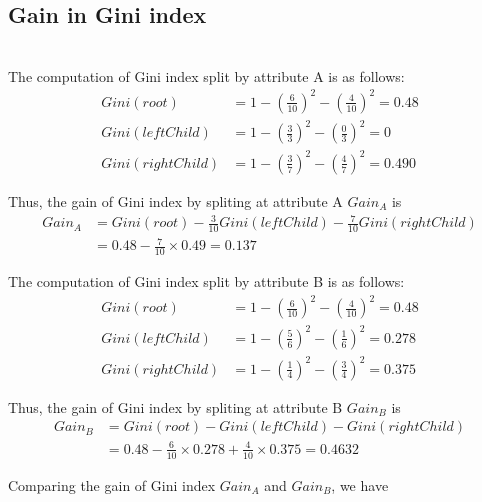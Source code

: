 \documentclass[11pt,a4paper]{article}
\begin{document}
\newpage
\subsection{Gain in Gini index} 

\\

The computation of Gini index split by attribute A is as follows:
\begin{align*}
    Gini(root) &= 1 - (\frac{6}{10})^2 - (\frac{4}{10})^2 = 0.48 \\
    Gini(leftChild) &= 1 - (\frac{3}{3})^2 - (\frac{0}{3})^2 = 0 \\
    Gini(rightChild) &= 1 - (\frac{3}{7})^2 - (\frac{4}{7})^2 = 0.490 
 \end{align*}

 Thus, the gain of Gini index by spliting at attribute A $Gain_A$ is 
\begin{align*}
    Gain_A &= Gini(root) - \frac{3}{10} Gini(leftChild) - \frac{7}{10}Gini(rightChild) \\
           &= 0.48 - \frac{7}{10} \times 0.49  = 0.137
 \end{align*}

The computation of Gini index split by attribute B is as follows:
\begin{align*}
    Gini(root) &= 1 - (\frac{6}{10})^2 - (\frac{4}{10})^2 = 0.48 \\
    Gini(leftChild) &= 1 - (\frac{5}{6})^2 - (\frac{1}{6})^2 = 0.278 \\
    Gini(rightChild) &= 1 - (\frac{1}{4})^2 - (\frac{3}{4})^2 = 0.375 
 \end{align*}

 Thus, the gain of Gini index by spliting at attribute B $Gain_B$ is 
\begin{align*}
    Gain_B &= Gini(root) - Gini(leftChild) - Gini(rightChild) \\
           &= 0.48 - \frac{6}{10} \times 0.278 + \frac{4}{10} \times 0.375 =
    0.4632
 \end{align*}

  Comparing the gain of Gini index $Gain_A$ and $Gain_B$, we have
\end{document}
